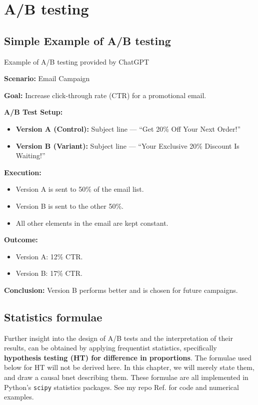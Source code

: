 \chapter{A/B testing}
\label{ch-a-b-testing}

\section{Simple Example of A/B testing} 
Example of A/B testing provided by ChatGPT

\textbf{Scenario:} Email Campaign

\textbf{Goal:} Increase click-through rate (CTR) for a promotional email.

\textbf{A/B Test Setup:}
\begin{itemize}
    \item \textbf{Version A (Control):} Subject line — ``Get 20\% Off Your Next Order!''
    \item \textbf{Version B (Variant):} Subject line — ``Your Exclusive 20\% Discount Is Waiting!''
\end{itemize}

\textbf{Execution:}
\begin{itemize}
    \item Version A is sent to 50\% of the email list.
    \item Version B is sent to the other 50\%.
    \item All other elements in the email are kept constant.
\end{itemize}

\textbf{Outcome:}
\begin{itemize}
    \item Version A: 12\% CTR.
    \item Version B: 17\% CTR.
\end{itemize}

\textbf{Conclusion:} Version B performs better and is chosen for future campaigns.

\section{Statistics formulae}
Further insight 
into the design of A/B tests and the interpretation
of their results, can be obtained by
applying frequentist statistics,
specifically {\bf hypothesis testing (HT)
for difference in proportions}.
The formulae used below for HT
will not be  derived here. 
In this chapter, we will merely state them,
and draw a causal bnet describing them.
These formulae are all implemented in Python's {\tt scipy} statistics packages. See my 
repo Ref.\cite{uplift_rocket}
for code and numerical examples.


